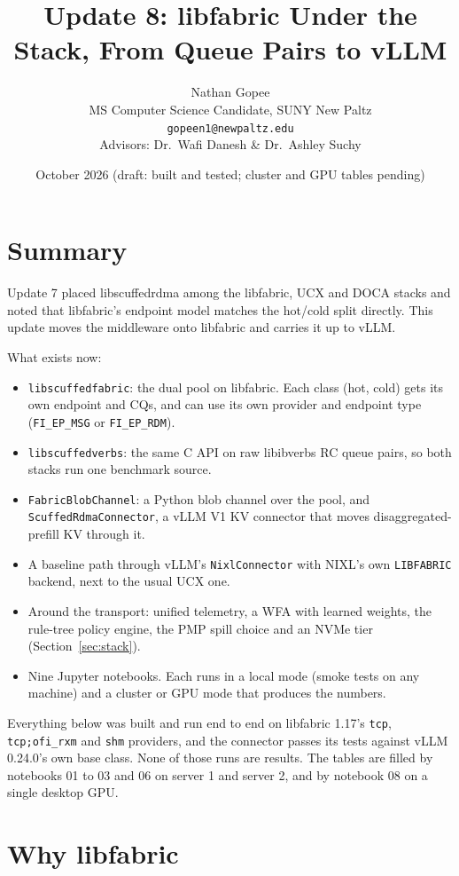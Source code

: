 \documentclass[11pt,letterpaper]{article}
\title{Update 8: libfabric Under the Stack, From Queue Pairs to vLLM}
\author{Nathan Gopee\\MS Computer Science Candidate, SUNY New Paltz\\\texttt{gopeen1@newpaltz.edu}\\[4pt]Advisors: Dr.\ Wafi Danesh \& Dr.\ Ashley Suchy}
\date{October 2026 (draft: built and tested; cluster and GPU tables pending)}
\begin{document}
\maketitle
\tableofcontents

\section{Summary}

Update 7 placed libscuffedrdma among the libfabric, UCX and DOCA stacks and noted that libfabric's endpoint model matches the hot/cold split directly. This update moves the middleware onto libfabric and carries it up to vLLM.

What exists now:
\begin{itemize}
\item \texttt{libscuffedfabric}: the dual pool on libfabric. Each class (hot, cold) gets its own endpoint and CQs, and can use its own provider and endpoint type (\texttt{FI\_EP\_MSG} or \texttt{FI\_EP\_RDM}).
\item \texttt{libscuffedverbs}: the same C API on raw libibverbs RC queue pairs, so both stacks run one benchmark source.
\item \texttt{FabricBlobChannel}: a Python blob channel over the pool, and \texttt{ScuffedRdmaConnector}, a vLLM V1 KV connector that moves disaggregated-prefill KV through it.
\item A baseline path through vLLM's \texttt{NixlConnector} with NIXL's own \texttt{LIBFABRIC} backend, next to the usual UCX one.
\item Around the transport: unified telemetry, a WFA with learned weights, the rule-tree policy engine, the PMP spill choice and an NVMe tier (Section~\ref{sec:stack}).
\item Nine Jupyter notebooks. Each runs in a local mode (smoke tests on any machine) and a cluster or GPU mode that produces the numbers.
\end{itemize}

Everything below was built and run end to end on libfabric 1.17's \texttt{tcp}, \texttt{tcp;ofi\_rxm} and \texttt{shm} providers, and the connector passes its tests against vLLM 0.24.0's own base class. None of those runs are results. The tables are filled by notebooks 01 to 03 and 06 on server 1 and server 2, and by notebook 08 on a single desktop GPU.

\section{Why libfabric}
\end{document}
